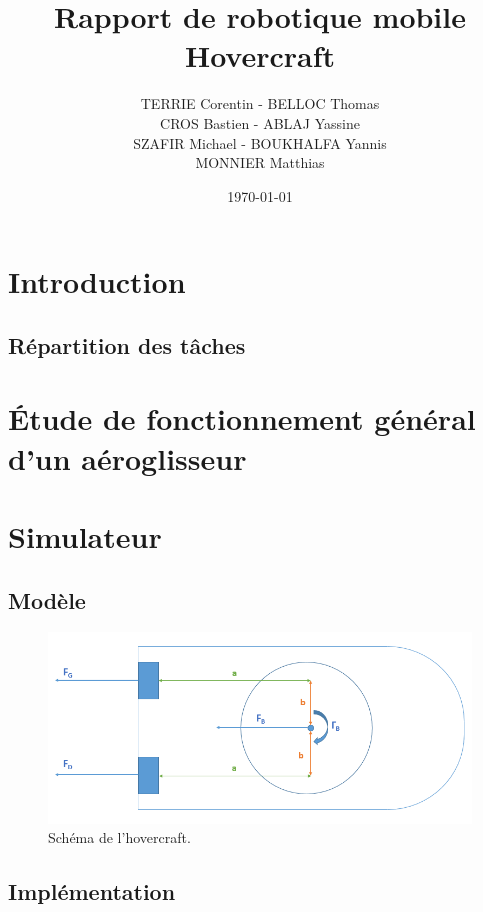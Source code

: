 \documentclass[a4paper,10pt]{article}
\title{Rapport de robotique mobile Hovercraft}
\author{TERRIE Corentin - BELLOC Thomas \\ CROS Bastien - ABLAJ Yassine \\ SZAFIR Michael - BOUKHALFA Yannis \\ MONNIER Matthias}
\date{\today}
\begin{document}

\tableofcontents
\clearpage



\section{Introduction}



\subsection{Répartition des tâches}





\section{Étude de fonctionnement général d'un aéroglisseur}



\section{Simulateur}
\subsection{Modèle}
\begin{figure}[H]
\bigcenter\includegraphics[scale=0.6]{images/schema_hover.png}
\caption{Schéma de l'hovercraft.}
\end{figure}
\subsection{Implémentation}
\end{document}
